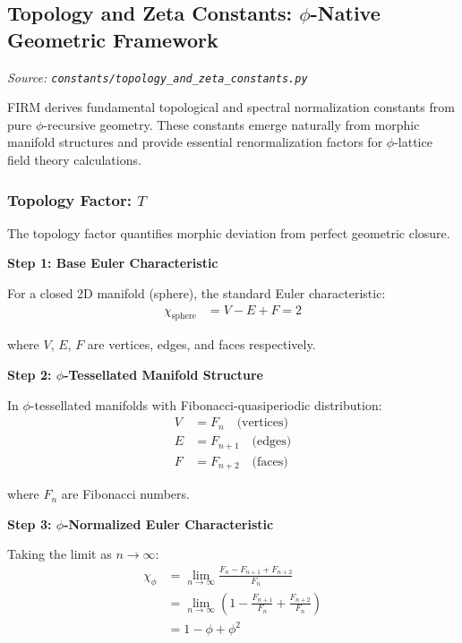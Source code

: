 
\subsection{Topology and Zeta Constants: $\phi$-Native Geometric Framework}
\textit{Source: \texttt{constants/topology\_and\_zeta\_constants.py}}

FIRM derives fundamental topological and spectral normalization constants from pure $\phi$-recursive geometry. These constants emerge naturally from morphic manifold structures and provide essential renormalization factors for $\phi$-lattice field theory calculations.

\subsubsection{Topology Factor: $T$}

The topology factor quantifies morphic deviation from perfect geometric closure.

\textbf{Step 1: Base Euler Characteristic}

For a closed 2D manifold (sphere), the standard Euler characteristic:
\begin{align}
\chi_{\text{sphere}} &= V - E + F = 2
\end{align}

where $V$, $E$, $F$ are vertices, edges, and faces respectively.

\textbf{Step 2: $\phi$-Tessellated Manifold Structure}

In $\phi$-tessellated manifolds with Fibonacci-quasiperiodic distribution:
\begin{align}
V &= F_n \quad \text{(vertices)} \\
E &= F_{n+1} \quad \text{(edges)} \\
F &= F_{n+2} \quad \text{(faces)}
\end{align}

where $F_n$ are Fibonacci numbers.

\textbf{Step 3: $\phi$-Normalized Euler Characteristic}

Taking the limit as $n \to \infty$:
\begin{align}
\chi_\phi &= \lim_{n \to \infty} \frac{F_n - F_{n+1} + F_{n+2}}{F_n} \\
&= \lim_{n \to \infty} \left(1 - \frac{F_{n+1}}{F_n} + \frac{F_{n+2}}{F_n}\right) \\
&= 1 - \phi + \phi^2
\end{align}

